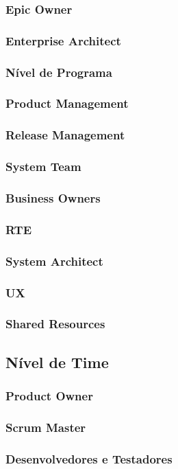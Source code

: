 \subsubsection{Epic Owner}
\subsubsection{Enterprise Architect}

\subsubsection{Nível de Programa}
\subsubsection{Product Management}
\subsubsection{Release Management}
\subsubsection{System Team}
\subsubsection{Business Owners}
\subsubsection{RTE}
\subsubsection{System Architect}
\subsubsection{UX}
\subsubsection{Shared Resources}

\subsection{Nível de Time}
\subsubsection{Product Owner}
\subsubsection{Scrum Master}
\subsubsection{Desenvolvedores e Testadores}
